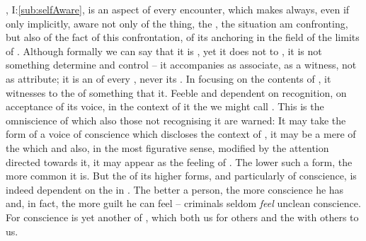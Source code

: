 \pa\label{selfomniscient} , I:\ref{sub:selfAware}, is an
aspect of every  encounter, which makes  always, even if only
implicitly, aware not only of the thing, the , the situation 
am confronting, but also of the fact of this confrontation, of its anchoring in
the field of   the limits of .
Although formally we can say that it is  , yet it does
not  to , it is not something  determine and control --
it accompanies  as  associate, as a witness, not as 
attribute; it is an  of every , never its .
In  focusing on the  contents of , it witnesses
to the  of something that  it. Feeble and dependent
on  recognition, on  acceptance of its voice, in the context of
 it  the  we might call .
%
This is the omniscience of which also those not recognising it are warned:
  It may take the form of a voice of conscience
which discloses the  context of , it may be a mere
 of the  which   and
also, in the most figurative sense, modified by the  attention
directed towards it, it may appear as the feeling of . The lower such a form, the more common it is. But the  of
its higher forms, and particularly of conscience, is indeed dependent on the
 in \yes. The better a person, the more conscience he
has and, in fact, the more guilt he can feel -- criminals seldom {\em feel}
unclean conscience. For conscience is yet another  of ,
which both  us for others and  the  with
others to us.

